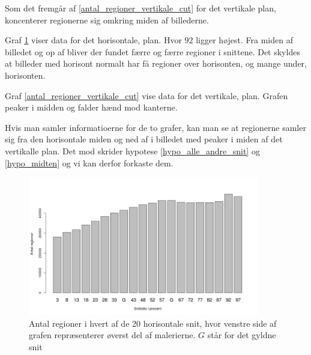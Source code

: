 Som det fremgår af \ref{antal_regioner_vertikale_cut} for det vertikale
plan, koncenterer regionerne sig omkring miden af billederne.

Graf \ref{antal_regioner_horisontale_cut} viser data for det
horisontale, plan. Hvor $92$ ligger højest. Fra miden af billedet og op
af bliver der fundet færre og færre regioner i snittene. Det skyldes at
billeder med horisont normalt har få regioner over horisonten, og mange
under, horisonten.

Graf \ref{antal_regioner_vertikale_cut} vise data for det vertikale,
plan. Grafen peaker i midden og falder hænd mod kanterne.

Hvis man samler informatioerne for de to grafer, kan man se at
regionerne samler sig fra den horisontale miden og ned af i billedet med
peaker i miden af det vertikalle plan. Det mod skrider hypotese
\ref{hypo_alle_andre_snit} og \ref{hypo_midten} og vi kan derfor
forkaste dem.

\begin{figure}[h!]
	\begin{center}
		\includegraphics[width=0.9\textwidth]{afsnit/resultater/billeder/cut2cut3eatsperratio.png}
	\end{center}
	\caption{Antal regioner i hvert af de 20 horisontale snit, hvor venstre side af grafen repræsenterer øverst del af malerierne. $G$ står for det gyldne snit}
	\label{antal_regioner_horisontale_cut}
\end{figure}

